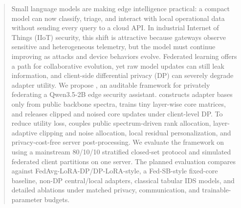 \begin{abstract}
Small language models are making edge intelligence practical: a compact model can now classify, triage, and interact with local operational data without sending every query to a cloud API. In industrial Internet of Things (IIoT) security, this shift is attractive because gateways observe sensitive and heterogeneous telemetry, but the model must continue improving as attacks and device behaviors evolve. Federated learning offers a path for collaborative evolution, yet raw model updates can still leak information, and client-side differential privacy (DP) can severely degrade adapter utility. We propose \method, an auditable framework for privately federating a Qwen3.5-2B edge security assistant. \method constructs adapter bases only from public backbone spectra, trains tiny layer-wise core matrices, and releases clipped and noised core updates under client-level DP. To reduce utility loss, \method couples public spectrum-driven rank allocation, layer-adaptive clipping and noise allocation, local residual personalization, and privacy-cost-free server post-processing. We evaluate the framework on \dataset using a mainstream 80/10/10 stratified closed-set protocol and simulated federated client partitions on one server. The planned evaluation compares against FedAvg-LoRA-DP/DP-LoRA-style, a Fed-SB-style fixed-core baseline, non-DP central/local adapters, classical tabular IDS models, and detailed ablations under matched privacy, communication, and trainable-parameter budgets. 
\end{abstract}

